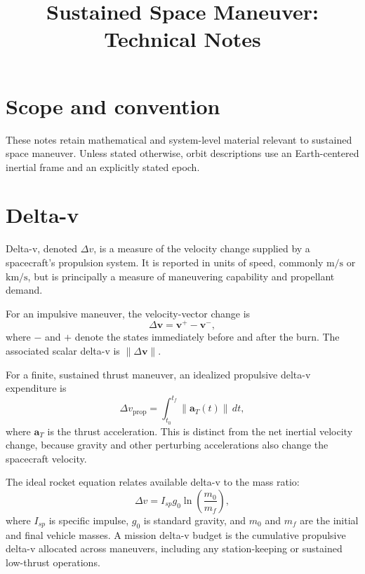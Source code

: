 \documentclass[11pt]{article}
\title{Sustained Space Maneuver: Technical Notes}
\author{}
\date{}
\begin{document}
\maketitle

\section{Scope and convention}

These notes retain mathematical and system-level material relevant to sustained
space maneuver. Unless stated otherwise, orbit descriptions use an
Earth-centered inertial frame and an explicitly stated epoch.

\section{Delta-v}

Delta-v, denoted $\Delta v$, is a measure of the velocity change supplied by a
spacecraft's propulsion system. It is reported in units of speed, commonly
$\mathrm{m/s}$ or $\mathrm{km/s}$, but is principally a measure of maneuvering
capability and propellant demand.

For an impulsive maneuver, the velocity-vector change is
\begin{equation}
  \Delta \boldsymbol{v} = \boldsymbol{v}^{+} - \boldsymbol{v}^{-},
\end{equation}
where $-$ and $+$ denote the states immediately before and after the burn. The
associated scalar delta-v is $\lVert\Delta\boldsymbol{v}\rVert$.

For a finite, sustained thrust maneuver, an idealized propulsive delta-v
expenditure is
\begin{equation}
  \Delta v_{\mathrm{prop}} = \int_{t_0}^{t_f} \lVert\boldsymbol{a}_{T}(t)\rVert\,dt,
\end{equation}
where $\boldsymbol{a}_{T}$ is the thrust acceleration. This is distinct from the
net inertial velocity change, because gravity and other perturbing accelerations
also change the spacecraft velocity.

The ideal rocket equation relates available delta-v to the mass ratio:
\begin{equation}
  \Delta v = I_{sp} g_0 \ln\!\left(\frac{m_0}{m_f}\right),
\end{equation}
where $I_{sp}$ is specific impulse, $g_0$ is standard gravity, and $m_0$ and
$m_f$ are the initial and final vehicle masses. A mission delta-v budget is the
cumulative propulsive delta-v allocated across maneuvers, including any
station-keeping or sustained low-thrust operations.
\end{document}
